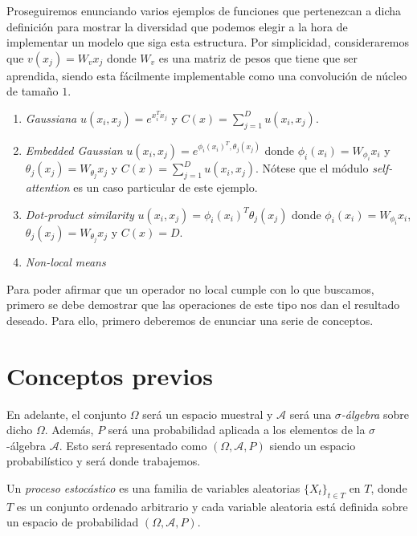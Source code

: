 \begin{itemize}
 Proseguiremos enunciando varios ejemplos de funciones que pertenezcan a dicha definición para mostrar la diversidad que podemos elegir a la hora de implementar un modelo que siga esta estructura. Por simplicidad, consideraremos que $v(x_j)=W_v x_j$ donde $W_v$ es una matriz de pesos que tiene que ser aprendida, siendo esta fácilmente implementable como una convolución de núcleo de tamaño $1$.

 \begin{enumerate}
 \item \emph{Gaussiana} $u(x_i,x_j)=e^{x_i^T x_j}$ y $C(x)= \sum_{j=1}^D u(x_i,x_j)$.
 \item \emph{Embedded Gaussian} $u(x_i,x_j)=e^{\phi_i(x_i)^T,\theta_j(x_j)}$ donde $\phi_i(x_i)=W_{\phi_i} x_i$ y $\theta_j(x_j)=W_{\theta_j} x_j$ y  $C(x)= \sum_{j=1}^D u(x_i,x_j)$. Nótese que el módulo \emph{self-attention} \cite{DBLP:journals/corr/VaswaniSPUJGKP17} es un caso particular de este ejemplo.
 \item \emph{Dot-product similarity} $u(x_i,x_j)=\phi_i(x_i)^T \theta_j(x_j)$ donde $\phi_i(x_i)=W_{\phi_i} x_i$, $\theta_j(x_j)=W_{\theta_j} x_j$ y $C(x)=D$.
 \item \emph{Non-local means} \cite{Buades:2005:NAI:1068508.1069066}
 \end{enumerate}

Para poder afirmar que un operador no local cumple con lo que buscamos, primero se debe demostrar que las operaciones de este tipo nos dan el resultado deseado. Para ello, primero deberemos de enunciar una serie de conceptos.

\section{Conceptos previos}
En adelante, el conjunto $\Omega$ será un espacio muestral y $\mathscr{A}$ será una \emph{$\sigma$-álgebra} sobre dicho $\Omega$. Además, $P$ será una probabilidad aplicada a los elementos de la $\sigma$-álgebra $\mathscr{A}$. Esto será representado como $(\Omega,\mathscr{A},P)$ siendo un espacio probabilístico y será donde trabajemos.

\begin{definicion}\label{def:pe}
  Un \emph{proceso estocástico} es una familia de variables aleatorias ${\{X_t\}}_{t \in T}$ en $T$, donde $T$ es un conjunto ordenado arbitrario y cada variable aleatoria está definida sobre un espacio de probabilidad $(\Omega, \mathscr{A}, P)$.
\end{definicion}


\end{itemize}

